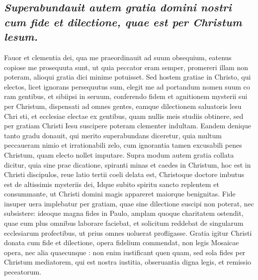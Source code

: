 \documentclass{article}
\begin{document}
\begin{pages}
\subsection*{\textit{Superabundauit autem gratia domini nostri cum fide et dilectione, quae est per Christum lesum. }}\pstart Fauor et clementia dei, qua me praeordinauit ad suum obsequium, eatenus copiose me prosequuta sunt, ut quia peccator eram semper, promereri illam non poteram, alioqui gratia dici minime potuisset. Sed hostem gratiae in Christo, qui electos, licet ignorans persequutus sum, elegit me ad portandum nomen suum co ram gentibus, et sibiipsi in seruum, conferendo fidem et agnitionem mysterii sui per Christum, dispensati ad omnes gentes, eamque dilectionem saluatoris lesu Chri sti, et ecclesiae electae ex gentibus, quam nullis meis studiis obtinere, sed per gratiam Christi Iesu suscipere poteram clementer indultam. Eandem denique tanto gradu donauit, qui merito superabundans diceretur, quia multum peccaueram nimio et irrationabili zelo, cum ignorantia tamen excusabili penes Christum, quam electo nollet imputare. Supra modum autem gratia collata dicitur, quia sine prae dicatione, spiranti minas et caedes in Christum, hoc est in Christi discipulos, reue latio tertii coeli delata est, Christoque doctore imbutus est de altissimis mysteriis dei, Idque subito spiritu sancto replentem et consummante, ut Christi domini magis appareret maiorque benignitas. Fide insuper uera implebatur per gratiam, quae sine dilectione suscipi non poterat, nec subsistere: ideoque magna fides in Paulo, amplam quoque charitatem ostendit, quae eum plus omnibus laborare faciebat, et solicitum reddebat de singularum ecclesiarum profectibus, ut prius omnes uoluerat profligasse. Gratia igitur Christi donata cum fide et dilectione, opera fidelium commendat, non legis Mosaicae opera, nec alia quaecunque : non enim iustificant quen quam, sed sola fides per Christum mediatorem, qui est nostra iustitia, obseruantia digna legis, et remissio peceatorum.  \pend
{}
{}

\end{pages}
\end{document}
